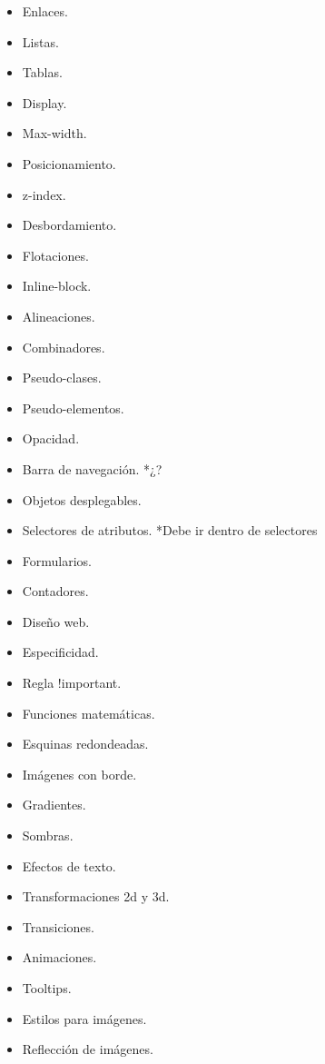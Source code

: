 \documentclass[12pt, letterpaper]{article}
\begin{document}
\begin{enumerate}
\begin{itemize}
\begin{itemize}
            \item Enlaces.
            \item Listas.
            \item Tablas.
            \item Display.
            \item Max-width.
            \item Posicionamiento.
            \item z-index.
            \item Desbordamiento.
            \item Flotaciones.
            \item Inline-block.
            \item Alineaciones.
            \item Combinadores.
            \item Pseudo-clases.
            \item Pseudo-elementos.
            \item Opacidad.
            \item Barra de navegación. *¿?
            \item Objetos desplegables.
            \item Selectores de atributos. *Debe ir dentro de selectores
            \item Formularios.
            \item Contadores.
            \item Diseño web.
            \item Especificidad.
            \item Regla !important.
            \item Funciones matemáticas.
            \item Esquinas redondeadas.
            \item Imágenes con borde.
            \item Gradientes.
            \item Sombras.
            \item Efectos de texto.
            \item Transformaciones 2d y 3d.
            \item Transiciones.
            \item Animaciones.
            \item Tooltips.
            \item Estilos para imágenes.
            \item Reflección de imágenes.

\end{itemize}
\end{itemize}
\end{enumerate}
\end{document}
